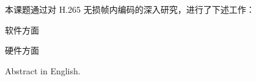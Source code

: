 \begin{cabstract}



    本课题通过对 H.265 无损帧内编码的深入研究，进行了下述工作：

    软件方面

    硬件方面
\end{cabstract}


\begin{eabstract}
    Abstract in English.
\end{eabstract}

